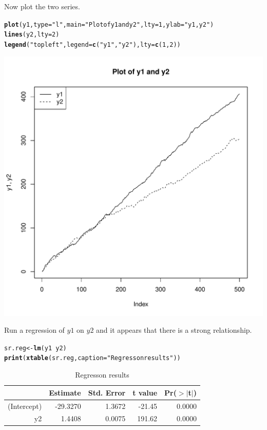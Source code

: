 \documentclass{article}\usepackage{graphicx, color}
\makeatletter
\def\maxwidth{ %
  \ifdim\Gin@nat@width>\linewidth
    \linewidth
  \else
    \Gin@nat@width
  \fi
}
\newcommand{\hlfunctioncall}[1]{\textcolor[rgb]{0.501960784313725,0,0.329411764705882}{\textbf{#1}}}%
\newcommand{\hlstring}[1]{\textcolor[rgb]{0.6,0.6,1}{#1}}%
\newenvironment{kframe}{%
 \def\at@end@of@kframe{}%
 \ifinner\ifhmode%
  \def\at@end@of@kframe{\end{minipage}}%
  \begin{minipage}{\columnwidth}%
 \fi\fi%
 \def\FrameCommand##1{\hskip\@totalleftmargin \hskip-\fboxsep
 \colorbox{shadecolor}{##1}\hskip-\fboxsep
     \hskip-\linewidth \hskip-\@totalleftmargin \hskip\columnwidth}%
 \MakeFramed {\advance\hsize-\width
   \@totalleftmargin\z@ \linewidth\hsize
   \@setminipage}}%
 {\par\unskip\endMakeFramed%
 \at@end@of@kframe}
\newenvironment{knitrout}{}{} %
\makeatother
\begin{document}
Now plot the two series. 

\begin{knitrout}
\color{fgcolor}\begin{kframe}
\begin{alltt}
\hlfunctioncall{plot}(y1, type = \hlstring{"l"}, main = \hlstring{"Plot of y1 and y2"}, lty = 1, ylab = \hlstring{"y1, y2"})
\hlfunctioncall{lines}(y2, lty = 2)
\hlfunctioncall{legend}(\hlstring{"topleft"}, legend = \hlfunctioncall{c}(\hlstring{"y1"}, \hlstring{"y2"}), lty = \hlfunctioncall{c}(1, 2))
\end{alltt}
\end{kframe}
\includegraphics[width=\maxwidth]{figure/plot} 

\end{knitrout}


Run a regression of $y1$ on $y2$ and it appears that there is a strong relationship.  
\begin{kframe}
\begin{alltt}
sr.reg <- \hlfunctioncall{lm}(y1 ~ y2)
\hlfunctioncall{print}(\hlfunctioncall{xtable}(sr.reg, caption = \hlstring{"Regresson results"}))
\end{alltt}
\end{kframe}%
\begin{table}[ht]
\begin{center}
\begin{tabular}{rrrrr}
  \hline
 & Estimate & Std. Error & t value & Pr($>$$|$t$|$) \\ 
  \hline
(Intercept) & -29.3270 & 1.3672 & -21.45 & 0.0000 \\ 
  y2 & 1.4408 & 0.0075 & 191.62 & 0.0000 \\ 
   \hline
\end{tabular}
\caption{Regresson results}
\end{center}
\end{table}
\end{document}
